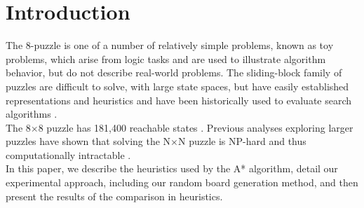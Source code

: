 
\section{Introduction}
\label{sec:intro}

The 8-puzzle is one of a number of relatively simple problems, known as toy problems, which arise from logic tasks and are used to illustrate algorithm behavior, but do not describe real-world problems. The sliding-block family of puzzles are difficult to solve, with large state spaces, but have easily established representations and heuristics and have been historically used to evaluate search algorithms \cite{intractable}. \\

The 8$\times$8 puzzle has 181,400 reachable states \cite{aima}.  Previous analyses exploring larger puzzles have shown that solving the N$\times$N puzzle is NP-hard and thus computationally intractable \cite{intractable}. \\

In this paper, we describe the heuristics used by the A* algorithm, detail our experimental approach, including our random board generation method, and then present the results of the comparison in heuristics.




